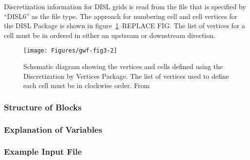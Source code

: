 Discretization information for DISL grids is read from the file that is specified by ``DISL6'' as the file type. The approach for numbering cell and cell vertices for the DISL Package is shown in figure~\ref{fig:gwf-fig3-2}--REPLACE FIG.  The list of vertices for a cell must be in ordered in either an upstream or downstream direction. 

\begin{figure}[ht]
	\centering
	\texttt{[image: Figures/gwf-fig3-2]}
	\caption{Schematic diagram showing the vertices and cells defined using the Discretization by Vertices Package. The list of vertices used to define each cell must be in clockwise order.  From \cite{modflow6gwf}}
	\label{fig:gwf-fig3-2}
\end{figure}


\vspace{5mm}
\subsubsection{Structure of Blocks}






\vspace{5mm}
\subsubsection{Explanation of Variables}
\begin{description}

\end{description}

\vspace{5mm}
\subsubsection{Example Input File}

